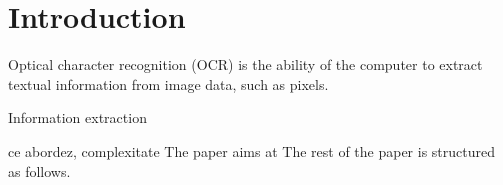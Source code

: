 \section{Introduction}
Optical character recognition (OCR) is the ability of the computer to extract textual information from image data, such as pixels. 

Information extraction

ce abordez, complexitate
The paper aims at 
The rest of the paper is structured as follows.